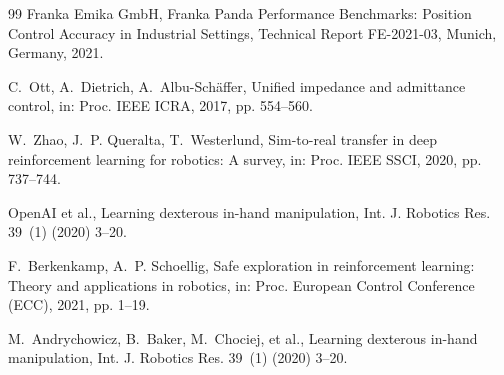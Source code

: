\documentclass[a4paper]{cas-sc}
\begin{document}
\begin{thebibliography}{99}
Franka Emika GmbH, Franka Panda Performance Benchmarks: Position Control Accuracy in Industrial Settings, Technical Report FE-2021-03, Munich, Germany, 2021.

C.~Ott, A.~Dietrich, A.~Albu-Schäffer, Unified impedance and admittance control, in: Proc. IEEE ICRA, 2017, pp. 554--560.

W.~Zhao, J.~P. Queralta, T.~Westerlund, Sim-to-real transfer in deep reinforcement learning for robotics: A survey, in: Proc. IEEE SSCI, 2020, pp. 737--744.

OpenAI et al., Learning dexterous in-hand manipulation, Int. J. Robotics Res. 39~(1) (2020) 3--20.

F.~Berkenkamp, A.~P. Schoellig, Safe exploration in reinforcement learning: Theory and applications in robotics, in: Proc. European Control Conference (ECC), 2021, pp. 1--19.

M.~Andrychowicz, B.~Baker, M.~Chociej, et al., Learning dexterous in-hand manipulation, Int. J. Robotics Res. 39~(1) (2020) 3--20.

\end{thebibliography}
\end{document}

